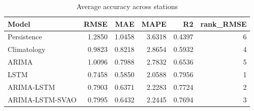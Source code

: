 \begin{table}[H]
\centering
\caption{Average accuracy across stations}
\label{tab:average}
\begin{singlespace}
\begin{tabular}{lrrrrr}
\toprule
Model & RMSE & MAE & MAPE & R2 & rank\_RMSE \\
\midrule
Persistence & 1.2850 & 1.0458 & 3.6318 & 0.4397 & 6 \\
Climatology & 0.9823 & 0.8218 & 2.8654 & 0.5932 & 4 \\
ARIMA & 1.0096 & 0.7988 & 2.7832 & 0.6536 & 5 \\
LSTM & 0.7458 & 0.5850 & 2.0588 & 0.7956 & 1 \\
ARIMA-LSTM & 0.7903 & 0.6371 & 2.2283 & 0.7724 & 2 \\
ARIMA-LSTM-SVAO & 0.7995 & 0.6432 & 2.2445 & 0.7694 & 3 \\
\bottomrule
\end{tabular}
\end{singlespace}
\end{table}
